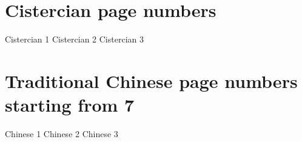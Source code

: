\documentclass{article}
\begin{document}
\section{Cistercian page numbers}
Cistercian 1 \newpage 
Cistercian 2 \newpage 
Cistercian 3 \newpage

\section{Traditional Chinese page numbers starting from 7}
\setcounter{page}{7}
Chinese 1 \newpage
Chinese 2 \newpage
Chinese 3 \newpage
\end{document}
